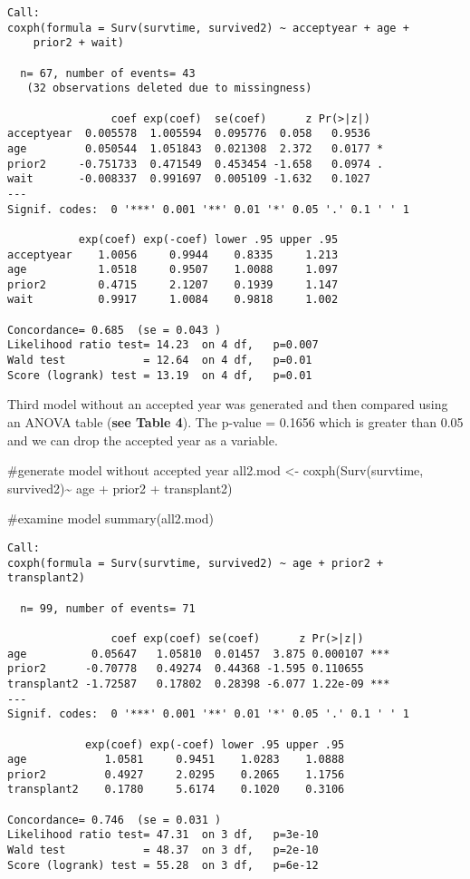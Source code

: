 \documentclass[
  letterpaper,
  DIV=11,
  numbers=noendperiod]{scrreprt}
\newenvironment{Shaded}{\begin{snugshade}}{\end{snugshade}}
\newcommand{\CommentTok}[1]{\textcolor[rgb]{0.37,0.37,0.37}{#1}}
\newcommand{\FunctionTok}[1]{\textcolor[rgb]{0.28,0.35,0.67}{#1}}
\newcommand{\NormalTok}[1]{\textcolor[rgb]{0.00,0.23,0.31}{#1}}
\newcommand{\OtherTok}[1]{\textcolor[rgb]{0.00,0.23,0.31}{#1}}
\newcommand{\SpecialCharTok}[1]{\textcolor[rgb]{0.37,0.37,0.37}{#1}}
\begin{document}
\begin{verbatim}
Call:
coxph(formula = Surv(survtime, survived2) ~ acceptyear + age + 
    prior2 + wait)

  n= 67, number of events= 43 
   (32 observations deleted due to missingness)

                coef exp(coef)  se(coef)      z Pr(>|z|)  
acceptyear  0.005578  1.005594  0.095776  0.058   0.9536  
age         0.050544  1.051843  0.021308  2.372   0.0177 *
prior2     -0.751733  0.471549  0.453454 -1.658   0.0974 .
wait       -0.008337  0.991697  0.005109 -1.632   0.1027  
---
Signif. codes:  0 '***' 0.001 '**' 0.01 '*' 0.05 '.' 0.1 ' ' 1

           exp(coef) exp(-coef) lower .95 upper .95
acceptyear    1.0056     0.9944    0.8335     1.213
age           1.0518     0.9507    1.0088     1.097
prior2        0.4715     2.1207    0.1939     1.147
wait          0.9917     1.0084    0.9818     1.002

Concordance= 0.685  (se = 0.043 )
Likelihood ratio test= 14.23  on 4 df,   p=0.007
Wald test            = 12.64  on 4 df,   p=0.01
Score (logrank) test = 13.19  on 4 df,   p=0.01
\end{verbatim}

Third model without an accepted year was generated and then compared
using an ANOVA table (\textbf{see Table 4}). The p-value = 0.1656 which
is greater than 0.05 and we can drop the accepted year as a variable.

\begin{Shaded}
\begin{Highlighting}[]
\CommentTok{\#generate model without accepted year}
\NormalTok{all2.mod }\OtherTok{\textless{}{-}} \FunctionTok{coxph}\NormalTok{(}\FunctionTok{Surv}\NormalTok{(survtime, survived2)}\SpecialCharTok{\textasciitilde{}}\NormalTok{ age }\SpecialCharTok{+}\NormalTok{ prior2 }\SpecialCharTok{+}\NormalTok{ transplant2)}

\CommentTok{\#examine model}
\FunctionTok{summary}\NormalTok{(all2.mod)}
\end{Highlighting}
\end{Shaded}

\begin{verbatim}
Call:
coxph(formula = Surv(survtime, survived2) ~ age + prior2 + transplant2)

  n= 99, number of events= 71 

                coef exp(coef) se(coef)      z Pr(>|z|)    
age          0.05647   1.05810  0.01457  3.875 0.000107 ***
prior2      -0.70778   0.49274  0.44368 -1.595 0.110655    
transplant2 -1.72587   0.17802  0.28398 -6.077 1.22e-09 ***
---
Signif. codes:  0 '***' 0.001 '**' 0.01 '*' 0.05 '.' 0.1 ' ' 1

            exp(coef) exp(-coef) lower .95 upper .95
age            1.0581     0.9451    1.0283    1.0888
prior2         0.4927     2.0295    0.2065    1.1756
transplant2    0.1780     5.6174    0.1020    0.3106

Concordance= 0.746  (se = 0.031 )
Likelihood ratio test= 47.31  on 3 df,   p=3e-10
Wald test            = 48.37  on 3 df,   p=2e-10
Score (logrank) test = 55.28  on 3 df,   p=6e-12
\end{verbatim}
\end{document}
